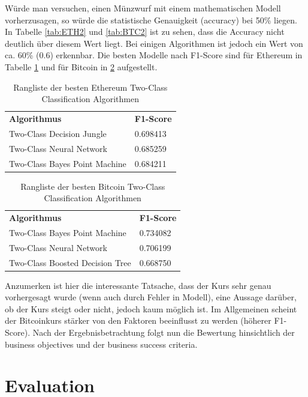 Würde man versuchen, einen Münzwurf mit einem mathematischen Modell vorherzusagen, so würde die statistische Genauigkeit (accuracy) bei 50\% liegen. In Tabelle \ref{tab:ETH2} und \ref{tab:BTC2} ist zu sehen, dass die Accuracy nicht deutlich über diesem Wert liegt. Bei einigen Algorithmen ist jedoch ein Wert von ca. 60\% (0.6) erkennbar.
Die besten Modelle nach F1-Score sind für Ethereum in Tabelle \ref{tab:ETHBest} und für Bitcoin in \ref{tab:BTCBest} aufgestellt.
\begin{table}[H]
\centering
\begin{tabular}{|p{4cm}|p{4cm}|}
\hline
\textbf{Algorithmus} & \textbf{F1-Score}\\ 
\hhline{==}
Two-Class Decision Jungle & 0.698413 \\ \hline
Two-Class Neural Network & 0.685259 \\ \hline
Two-Class Bayes Point Machine & 0.684211 \\ \hline
\end{tabular}
\caption{Rangliste der besten Ethereum Two-Class Classification Algorithmen}
\label{tab:ETHBest}
\end{table}

\begin{table}[H]
\centering
\begin{tabular}{|p{4cm}|p{4cm}|}
\hline
\textbf{Algorithmus} & \textbf{F1-Score}\\ 
\hhline{==}
Two-Class Bayes Point Machine & 0.734082 \\ \hline
Two-Class Neural Network & 0.706199 \\ \hline
Two-Class Boosted Decision Tree & 0.668750 \\ \hline
\end{tabular}
\caption{Rangliste der besten Bitcoin Two-Class Classification Algorithmen}
\label{tab:BTCBest}
\end{table}
Anzumerken ist hier die interessante Tatsache, dass der Kurs sehr genau vorhergesagt wurde (wenn auch durch Fehler in Modell), eine Aussage darüber, ob der Kurs steigt oder nicht, jedoch kaum möglich ist. Im Allgemeinen scheint der Bitcoinkurs stärker von den Faktoren beeinflusst zu werden (höherer F1-Score).
Nach der Ergebnisbetrachtung folgt nun die Bewertung hinsichtlich der business objectives und der business success criteria.

\section{Evaluation}\label{sec:p5}
